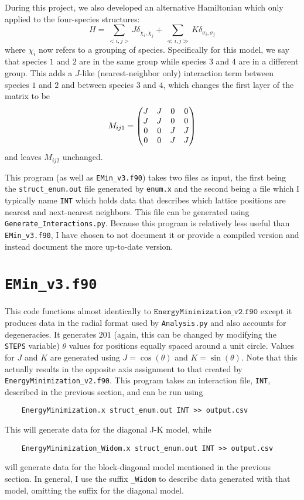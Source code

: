 \documentclass[12pt]{article}
\begin{document}
During this project, we also developed an alternative Hamiltonian which only applied to the four-species structures:
\begin{equation}
    H = \sum_{<i,j>} J \delta_{\chi_i, \chi_j} + \sum_{\ll i,j\gg} K \delta_{\sigma_i, \sigma_j}
\end{equation}
where $ \chi_i $ now refers to a grouping of species. Specifically for this model, we say that species $ 1 $ and $ 2 $ are in the same group while species $ 3 $ and $ 4 $ are in a different group. This adds a $ J $-like (nearest-neighbor only) interaction term between species $ 1 $ and $ 2 $ and between species $ 3 $ and $ 4 $, which changes the first layer of the matrix to be
\begin{equation}
M_{ij1} = \mqty(J&J&0&0\\J&J&0&0\\0&0&J&J\\0&0&J&J)
\end{equation}
and leaves $ M_{ij2} $ unchanged.

This program (as well as \texttt{EMin\_v3.f90}) takes two files as input, the first being the \texttt{struct\_enum.out} file generated by \texttt{enum.x} and the second being a file which I typically name \texttt{INT} which holds data that describes which lattice positions are nearest and next-nearest neighbors. This file can be generated using \texttt{Generate\_Interactions.py}. Because this program is relatively less useful than \texttt{EMin\_v3.f90}, I have chosen to not document it or provide a compiled version and instead document the more up-to-date version.

\section{\texttt{EMin\_v3.f90}}

This code functions almost identically to $ \texttt{EnergyMinimization\_v2.f90} $ except it produces data in the radial format used by \texttt{Analysis.py} and also accounts for degeneracies. It generates $ 201 $ (again, this can be changed by modifying the \texttt{STEPS} variable) $ \theta $ values for positions equally spaced around a unit circle. Values for $ J $ and $ K $ are generated using $ J = \cos(\theta) $ and $ K = \sin(\theta) $. Note that this actually results in the opposite axis assignment to that created by \texttt{EnergyMinimization\_v2.f90}. This program takes an interaction file, \texttt{INT}, described in the previous section, and can be run using
\begin{verbatim}
    EnergyMinimization.x struct_enum.out INT >> output.csv
\end{verbatim}
This will generate data for the diagonal J-K model, while
\begin{verbatim}
    EnergyMinimization_Widom.x struct_enum.out INT >> output.csv
\end{verbatim}
will generate data for the block-diagonal model mentioned in the previous section. In general, I use the suffix \texttt{\_Widom} to describe data generated with that model, omitting the suffix for the diagonal model.
\end{document}
